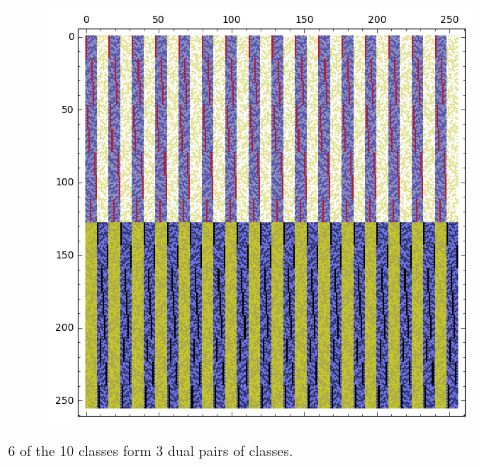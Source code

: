 \documentclass[pdf,sprung,slideColor,nocolorBG]{beamer}
\newenvironment{colortheme}[1]{
\def\ProvidesPackageRCS $##1${\relax}
\renewcommand{\ProcessOptions}{\relax}
\makeatletter

\makeatother
}{}
\begin{document}
\begin{colortheme}{jubata}
\begin{frame}
\begin{figure}
\begin{minipage}{.48\textwidth}
  \label{fig:c8_10_bent_cayley_graph_index_matrix}
\end{minipage}
\begin{minipage}{.48\textwidth}
  \centering
  \includegraphics[width=.9\linewidth]{../matrix_plot/re8_10_dual_cayley_graph_index_matrix.png}
  \label{fig:c8_10_dual_cayley_graph_index_matrix}
\end{minipage}%
\end{figure}
6 of the 10 classes form 3 dual pairs of classes.
\end{frame}
\end{colortheme}
\end{document}
